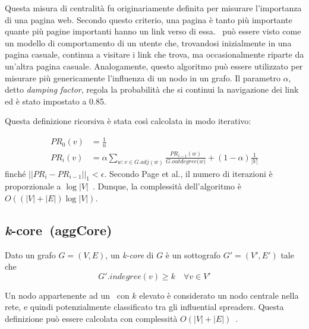 Questa misura di centralità fu originariamente definita per misurare l'importanza di una pagina web. 
Secondo questo criterio, una pagina è tanto più importante quante più pagine importanti hanno un link 
verso di essa. 
\PageRank\ può essere visto come un modello di comportamento di un utente che, trovandosi inizialmente
in una pagina casuale, continua a visitare i link che trova, ma occasionalmente riparte da un'altra 
pagina casuale.
Analogamente, questo algoritmo può essere utilizzato per misurare più genericamente l'influenza di un nodo 
in un grafo.
Il parametro $\alpha$, detto \emph{damping factor}, regola la probabilità che si continui la navigazione dei link
ed è stato impostato a \num{0.85}.

Questa definizione ricorsiva è stata così calcolata in modo iterativo: 

\begin{equation*}
    \begin{split}
\mathit{PR}_0(v)&= \frac{1}{n}\\
\mathit{PR}_i(v)&= \alpha \sum_{w : v \in G.\mathit{adj}(w)} 
\frac{\mathit{PR}_{i-1}(w)}{G.\mathit{outdegree(}w)} + 
(1-\alpha)\frac{1}{|V|}
    \end{split}
\end{equation*}
finché $||\mathit{PR}_{i} - \mathit{PR}_{i-1}||_1 < \epsilon$. Secondo Page et al., il numero di iterazioni 
è proporzionale a $\log{|V|}$~\cite{page:pagerank}. Dunque, la complessità dell'algoritmo è $O((|V| + |E|)\log{|V|})$.


\subsection{\emph{k}-core~(aggCore)}
\begin{definizione}[\kcore]
    \label{def:kcore}
    Dato un grafo $G=(V, E)$, un \emph{k-core} di $G$ è un sottografo $G'=(V',E')$
    tale che 
    \begin{equation*}
        G'.\mathit{indegree}(v) \geq k \quad \forall v \in V'
    \end{equation*}
\end{definizione}
Un nodo appartenente ad un \kcore\ con $k$ elevato è considerato un nodo centrale 
nella rete, e quindi potenzialmente classificato tra gli influential spreaders.
Questa definizione può essere calcolata con complessità $O(|V| + |E|)$~\cite{batagelj:kcore}.

